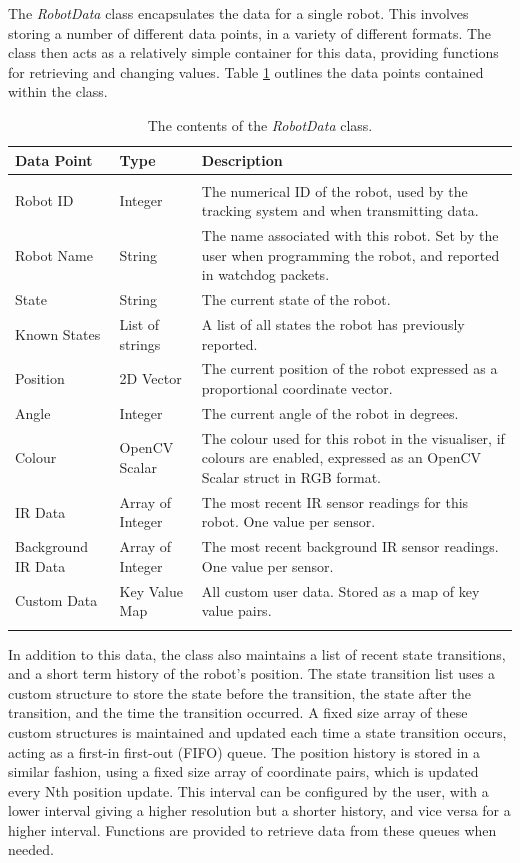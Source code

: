 The \textit{RobotData} class encapsulates the data for a single robot. This involves storing a number of different data points, in a variety of different formats. The class then acts as a relatively simple container for this data, providing functions for retrieving and changing values. Table \ref{tab:RobotDataContents} outlines the data points contained within the class.

\begin{longtable}{ l l p{8cm} }
\caption[Robot Data Contents]{The contents of the \textit{RobotData} class.}\\
 \hline
 Data Point & Type & Description\\
 \hline\\
 Robot ID & Integer & The numerical ID of the robot, used by the tracking system and when transmitting data.\\
 Robot Name & String & The name associated with this robot. Set by the user when programming the robot, and reported in watchdog packets. \\
 State & String & The current state of the robot. \\
 Known States & List of strings & A list of all states the robot has previously reported. \\
 Position & 2D Vector & The current position of the robot expressed as a proportional coordinate vector. \\
 Angle & Integer & The current angle of the robot in degrees. \\
 Colour & OpenCV Scalar & The colour used for this robot in the visualiser, if colours are enabled, expressed as an OpenCV Scalar struct in RGB format. \\
 IR Data & Array of Integer & The most recent IR sensor readings for this robot. One value per sensor. \\
 Background IR Data & Array of Integer & The most recent background IR sensor readings. One value per sensor. \\
 Custom Data & Key Value Map & All custom user data. Stored as a map of key value pairs. \\
 
 \label{tab:RobotDataContents}
\end{longtable}

In addition to this data, the class also maintains a list of recent state transitions, and a short term history of the robot's position. The state transition list uses a custom structure to store the state before the transition, the state after the transition, and the time the transition occurred. A fixed size array of these custom structures is maintained and updated each time a state transition occurs, acting as a first-in first-out (FIFO) queue. The position history is stored in a similar fashion, using a fixed size array of coordinate pairs, which is updated every Nth position update. This interval can be configured by the user, with a lower interval giving a higher resolution but a shorter history, and vice versa for a higher interval. Functions are provided to retrieve data from these queues when needed.

